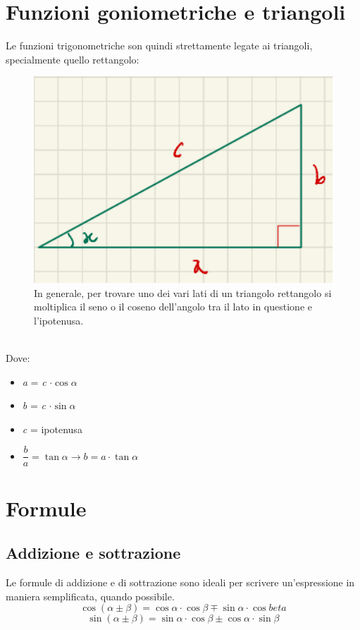 \documentclass[12pt]{article}
\begin{document}
\section{Funzioni goniometriche e triangoli}
Le funzioni trigonometriche son quindi strettamente legate ai triangoli, specialmente quello rettangolo:
\begin{figure}[!htb]
    \centering
    \includegraphics[width=1\textwidth, height=.7\textheight,keepaspectratio]{lezione_6/trigonometria.png}
    \begin{center}
        \caption{\label{fig:triangolo_rettangolo_trigonometria}In generale, per trovare uno dei vari lati di un triangolo rettangolo si moltiplica il seno o il coseno dell'angolo tra il lato in questione e l'ipotenusa.}
    \end{center}
\end{figure}\\
Dove:
\begin{itemize}
    \item \textit{a} = \textit{c} $\cdot \cos{\alpha}$
    \item \textit{b} = \textit{c} $\cdot \sin{\alpha}$
    \item \textit{c} = ipotenusa
    \item $\dfrac{b}{a} = \tan{\alpha} \rightarrow b = a \cdot \tan{\alpha}$
\end{itemize}
\section{Formule}
\subsection{Addizione e sottrazione}
Le formule di addizione e di sottrazione sono ideali per scrivere un'espressione in maniera semplificata, quando possibile.
\begin{equation}
    \cos({\alpha \pm \beta}) = \cos{\alpha} \cdot \cos{\beta} \mp \sin{\alpha} \cdot \cos{beta} \label{eq:somma_sottrazione_coseno}
\end{equation}
\begin{equation}
    \sin({\alpha \pm \beta}) = \sin{\alpha} \cdot \cos{\beta} \pm \cos{\alpha} \cdot \sin{\beta} \label{eq:somma_sottrazione_seno}
\end{equation}
\end{document}

